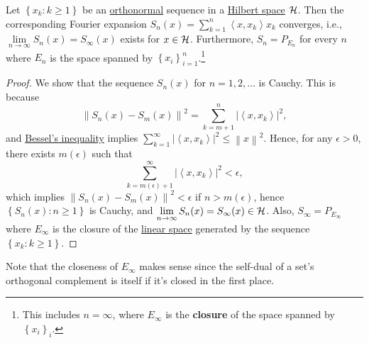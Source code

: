 \begin{theorem}
	Let \(\left\{ x_{k} \colon k\geq 1 \right\} \) be an \hyperref[def:orthonormal-system]{orthonormal} sequence in a \hyperref[def:Hilbert-space]{Hilbert space} \(\mathcal{\MakeUppercase{h}} \). Then the corresponding Fourier expansion \(S_n(x) = \sum_{k=1}^{n} \left\langle  x, x_{k} \right\rangle  x_{k}\) converges, i.e., \(\lim\limits_{n \to \infty} S_{n} (x) = S_{\infty }(x)\) exists for \(x\in \mathcal{\MakeUppercase{h}} \). Furthermore, \(S_n = P_{E_n}\) for every \(n\) where \(E_n\) is the space spanned by \(\left\{ x_i \right\} _{i=1}^n\).\footnote{This includes \(n=\infty\), where \(E_\infty \) is the \textbf{closure} of the space spanned by \(\left\{ x_i \right\}_i\).}
\end{theorem}
\begin{proof}
	We show that the sequence \(S_n(x)\) for \(n = 1, 2, \ldots\) is Cauchy. This is because
	\[
		\left\lVert S_n(x) - S_m(x)\right\rVert ^{2} = \sum_{k=m+1}^{n} \left\vert \left\langle x, x_{k}\right\rangle  \right\vert ^{2},
	\]
	and \hyperref[rmk:Bessel-ineq]{Bessel's inequality} implies \(\sum_{k=1}^{\infty} \left\vert \left\langle x, x_{k}  \right\rangle  \right\vert ^{2} \leq \left\lVert x\right\rVert ^{2} \). Hence, for any \(\epsilon > 0\), there exists \(m(\epsilon )\) such that
	\[
		\sum_{k=m(\epsilon )+1}^{\infty} \left\vert \left\langle x, x_{k}  \right\rangle  \right\vert ^{2} < \epsilon,
	\]
	which implies \(\left\lVert S_n(x) - S_m(x)\right\rVert ^{2} < \epsilon \) if \(n > m(\epsilon )\), hence \(\left\{ S_{n} (x)\colon n\geq 1 \right\}\) is Cauchy, and \(\lim\limits_{n \to \infty} S_n(x)= S_\infty (x)\in \mathcal{\MakeUppercase{h}} \). Also, \(S_\infty = P_{E_\infty }\) where \(E_\infty \) is the closure of the \hyperref[def:linear-vector-space]{linear space} generated by the sequence \(\left\{ x_{k} \colon k \geq 1 \right\} \).
\end{proof}

\begin{remark}
	Note that the closeness of \(E_\infty \) makes sense since the self-dual of a set's orthogonal complement is itself if it's closed in the first place.
\end{remark}